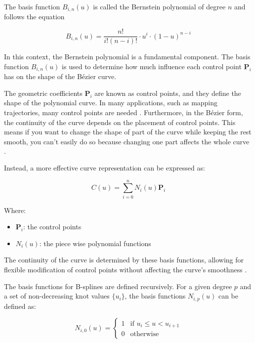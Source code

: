 The basis function \( B_{i,n}(u) \) is called the Bernstein polynomial of degree \( n \) and follows the equation

\begin{equation}
    B_{i,n}(u) = \frac{n!}{i!(n - i)!} \cdot u^i \cdot (1 - u)^{n - i} \label{}
\end{equation}

In this context, the Bernstein polynomial is a fundamental component. 
The basis function \( B_{i,n}(u) \) is used to determine how much influence each control 
point \( \mathbf{P}_i \) has on the shape of the Bézier curve.

The geometric coefficients \( \mathbf{P}_i \) are known as control points, and they define 
the shape of the polynomial curve. In many applications, such as mapping trajectories, 
many control points are needed \cite{R28}.
Furthermore, in the Bézier form, the continuity of the curve depends on the placement of 
control points. This means if you want to change the shape of part of the curve while keeping 
the rest smooth, you can't easily do so because changing one part affects the whole curve \cite{R29}.

Instead, a more effective curve representation can be expressed as:

\begin{equation}
    C(u) = \sum_{i=0}^{n} N_i(u) \mathbf{P}_i
\end{equation}

Where:
\begin{itemize}
    \item \( \mathbf{P}_i \): the control points
    \item \( N_i(u) \): the piece wise polynomial functions
\end{itemize}
The continuity of the curve is determined by these basis functions, allowing for flexible modification of 
control points without affecting the curve's smoothness \cite{R29}.

The basis functions for B-splines are defined recursively. For a given degree \( p \) and a set of non-decreasing knot values 
\( \{ u_i \} \), the basis functions \( N_{i,p}(u) \) can be defined as:

\begin{equation}
    N_{i,0}(u) = 
\begin{cases} 
1 & \text{if } u_i \leq u < u_{i+1} \\
0 & \text{otherwise}
\end{cases}
\end{equation}

